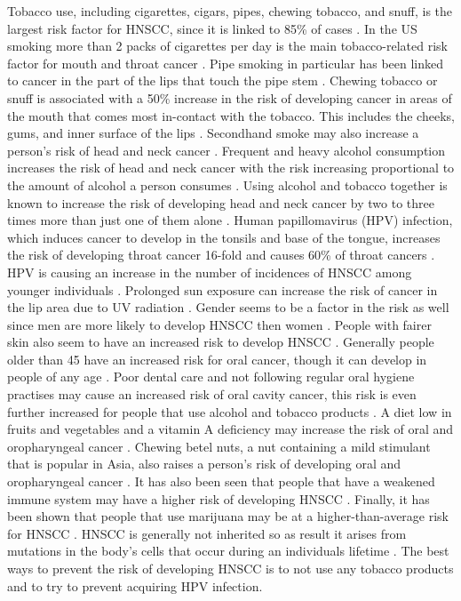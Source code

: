 \documentclass[\main/thesis.tex]{subfiles}
\begin{document}
Tobacco use, including cigarettes, cigars, pipes, chewing tobacco, and snuff, is the largest risk factor for HNSCC, since it is linked to 85\% of cases \cite{cancer.net_2021}. In the US smoking more than 2 packs of cigarettes per day is the main tobacco-related risk factor for mouth and throat cancer \cite{merckmanuals.com_2021}. Pipe smoking in particular has been linked to cancer in the part of the lips that touch the pipe stem \cite{merckmanuals.com_2021}. Chewing tobacco or snuff is associated with a 50\% increase in the risk of developing cancer in areas of the mouth that comes most in-contact with the tobacco. This includes the cheeks, gums, and inner surface of the lips \cite{merckmanuals.com_2021}. Secondhand smoke may also increase a person's risk of head and neck cancer \cite{merckmanuals.com_2021}. Frequent and heavy alcohol consumption increases the risk of head and neck cancer with the risk increasing proportional to the amount of alcohol a person consumes \cite{merckmanuals.com_2021}. Using alcohol and tobacco together is known to increase the risk of developing head and neck cancer by two to three times more than just one of them alone \cite{merckmanuals.com_2021}. Human papillomavirus (HPV) infection, which induces cancer to develop in the tonsils and base of the tongue, increases the risk of developing throat cancer 16-fold and causes 60\% of throat cancers \cite{merckmanuals.com_2021}. HPV is causing an increase in the number of incidences of HNSCC among younger individuals \cite{merckmanuals.com_2021}. Prolonged sun exposure can increase the risk of cancer in the lip area due to UV radiation \cite{merckmanuals.com_2021}. Gender seems to be a factor in the risk as well since men are more likely to develop HNSCC then women \cite{merckmanuals.com_2021}. People with fairer skin also seem to have an increased risk to develop HNSCC \cite{cancer.net_2021}. Generally people older than 45 have an increased risk for oral cancer, though it can develop in people of any age \cite{cancer.net_2021}. Poor dental care and not following regular oral hygiene practises may cause an increased risk of oral cavity cancer, this risk is even further increased for people that use alcohol and tobacco products \cite{merckmanuals.com_2021}. A diet low in fruits and vegetables and a vitamin A deficiency may increase the risk of oral and oropharyngeal cancer \cite{cancer.net_2021}. Chewing betel nuts, a nut containing a mild stimulant that is popular in Asia, also raises a person's risk of developing oral and oropharyngeal cancer \cite{cancer.net_2021}. It has also been seen that people that have a weakened immune system may have a higher risk of developing HNSCC \cite{cancer.net_2021}. Finally, it has been shown that people that use marijuana may be at a higher-than-average risk for HNSCC \cite{cancer.net_2021}. HNSCC is generally not inherited so as result it arises from mutations in the body's cells that occur during an individuals lifetime \cite{medlineplus.gov_2021}. The best ways to prevent the risk of developing HNSCC is to not use any tobacco products and to try to prevent acquiring HPV infection. 
\end{document}
